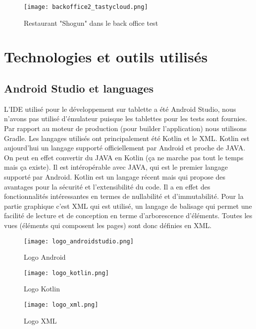 \begin{figure}[!htb]
  \centering
  \texttt{[image: backoffice2\_tastycloud.png]}
  \caption{Restaurant "Shogun" dans le back office test}
  \label{fig:boat1}
\end{figure}

\section{Technologies et outils utilisés}

\subsection{Android Studio et languages}

L'IDE utilisé pour le développement sur tablette a été Android Studio, nous n'avons pas utilisé d'émulateur puisque les tablettes pour les tests sont fournies. Par rapport au moteur de production (pour builder l'application) nous utilisons Gradle. Les langages utilisés ont principalement été Kotlin et le XML. Kotlin est aujourd'hui un langage supporté officiellement par Android et proche de JAVA. On peut en effet convertir du JAVA en Kotlin (ça ne marche pas tout le temps mais ça existe). Il est intéropérable avec JAVA, qui est le premier langage supporté par Android. Kotlin est un langage récent mais qui propose des avantages pour la sécurité et l'extensibilité du code. Il a en effet des fonctionnalités intéressantes en termes de nullabilité et d'immutabilité. Pour la partie graphique c'est XML qui est utilisé, un langage de balisage qui permet une facilité de lecture et de conception en terme d'arborescence d'éléments. Toutes les vues (éléments qui composent les pages) sont donc définies en XML.\\



\begin{figure}[!htp]
  \centering
  \begin{minipage}[b]{0.2\textwidth}
    \texttt{[image: logo\_androidstudio.png]}
    \caption{Logo Android}
  \end{minipage}
  \hfill
  \begin{minipage}[b]{0.2\textwidth}
    \texttt{[image: logo\_kotlin.png]}
    \caption{Logo Kotlin}
  \end{minipage}
  \hfill
  \begin{minipage}[b]{0.2\textwidth}
    \texttt{[image: logo\_xml.png]}
    \caption{Logo XML}
  \end{minipage}
\end{figure}

